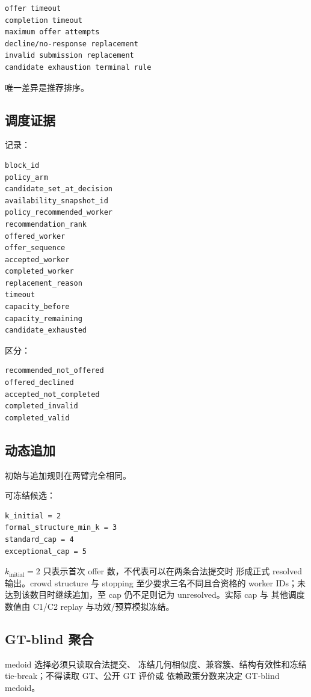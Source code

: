 \begin{verbatim}
offer timeout
completion timeout
maximum offer attempts
decline/no-response replacement
invalid submission replacement
candidate exhaustion terminal rule
\end{verbatim}

唯一差异是推荐排序。

\subsection{调度证据}

记录：

\begin{verbatim}
block_id
policy_arm
candidate_set_at_decision
availability_snapshot_id
policy_recommended_worker
recommendation_rank
offered_worker
offer_sequence
accepted_worker
completed_worker
replacement_reason
timeout
capacity_before
capacity_remaining
candidate_exhausted
\end{verbatim}

区分：

\begin{verbatim}
recommended_not_offered
offered_declined
accepted_not_completed
completed_invalid
completed_valid
\end{verbatim}

\subsection{动态追加}

初始与追加规则在两臂完全相同。

可冻结候选：

\begin{verbatim}
k_initial = 2
formal_structure_min_k = 3
standard_cap = 4
exceptional_cap = 5
\end{verbatim}

\(k_{\mathrm{initial}}=2\) 只表示首次 offer 数，不代表可以在两条合法提交时
形成正式 resolved 输出。crowd structure 与 stopping 至少要求三名不同且合资格的
worker IDs；未达到该数目时继续追加，至 cap 仍不足则记为 unresolved。实际 cap 与
其他调度数值由 C1/C2 replay 与功效/预算模拟冻结。

\subsection{GT-blind 聚合}

medoid 选择必须只读取合法提交、
冻结几何相似度、兼容簇、结构有效性和冻结 tie-break；不得读取 GT、公开 GT 评价或
依赖政策分数来决定 GT-blind medoid。

